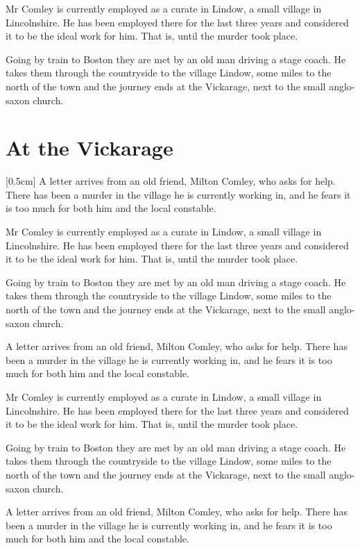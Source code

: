\documentclass[pdftex,a4paper]{book}
\newcommand{\RefereeOnly}[1]{\color{referee-dark}\textit{{#1}}}
\newcommand{\RefereeNotes}[1]{\marginnote{\RefereeOnly{{#1}}}[0.5cm]}
\begin{document}
Mr Comley is currently employed as a curate in Lindow, a small village in Lincolnshire. He has been employed there for the last three years and considered it to be the ideal work for him. That is, until the murder took place.

Going by train to Boston they are met by an old man driving a stage coach. He takes them through the countryside to the village Lindow, some miles to the north of the town and the journey ends at the Vickarage, next to the small anglo-saxon church.

\chapter{At the Vickarage}
\RefereeNotes{Anteckningar om den här episoden}
A letter arrives from an old friend, Milton Comley, who asks for help. There has been a murder in the village he is currently working in, and he fears it is too much for both him and the local constable.

Mr Comley is currently employed as a curate in Lindow, a small village in Lincolnshire. He has been employed there for the last three years and considered it to be the ideal work for him. That is, until the murder took place.

Going by train to Boston they are met by an old man driving a stage coach. He takes them through the countryside to the village Lindow, some miles to the north of the town and the journey ends at the Vickarage, next to the small anglo-saxon church.

A letter arrives from an old friend, Milton Comley, who asks for help. There has been a murder in the village he is currently working in, and he fears it is too much for both him and the local constable.

Mr Comley is currently employed as a curate in Lindow, a small village in Lincolnshire. He has been employed there for the last three years and considered it to be the ideal work for him. That is, until the murder took place.

Going by train to Boston they are met by an old man driving a stage coach. He takes them through the countryside to the village Lindow, some miles to the north of the town and the journey ends at the Vickarage, next to the small anglo-saxon church.

A letter arrives from an old friend, Milton Comley, who asks for help. There has been a murder in the village he is currently working in, and he fears it is too much for both him and the local constable.
\end{document}
